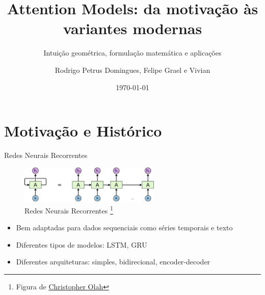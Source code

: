\documentclass{beamer}
\title{Attention Models: da motivação às variantes modernas}
\subtitle{Intuição geométrica, formulação matemática e aplicações}
\author{Rodrigo Petrus Domingues, Felipe Grael e Vivian}
\date{\today}
\begin{document}
\maketitle


\section{Motivação e Histórico}


\begin{frame}{Redes Neurais Recorrentes}

	\begin{figure}[h]
		\centering
		\includegraphics[width=0.6\textwidth]{assets/colah-RNN-unrolled.png}
		\caption{Redes Neurais Recorrentes \footnote{Figura de \href{https://colah.github.io/posts/2015-08-Understanding-LSTMs/}{Christopher Olah}}}
	\end{figure}

	\begin{itemize}
		\item Bem adaptadas para dados sequenciais como séries temporais e texto
		\item Diferentes tipos de modelos: LSTM, GRU
		\item Diferentes arquiteturas: simples, bidirecional, encoder-decoder
	\end{itemize}

\end{frame}
\end{document}
